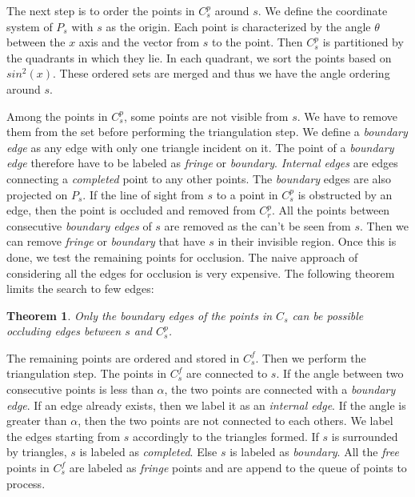 \documentclass[a4paper]{article}
\begin{document}
The next step is to order the points in $C^p_s$ around $s$. We define the coordinate system of $P_s$ with $s$ as the origin. Each point is characterized by the angle $\theta$ between the $x$ axis and the vector from $s$ to the point. Then $C^p_s$ is partitioned by the quadrants in which they lie. In each quadrant, we sort the points based on $sin^2(x)$. These ordered sets are merged and thus we have the angle ordering around $s$.

Among the points in $C^p_s$, some points are not visible from $s$. We have to remove them from the set before performing the triangulation step. We define a \textit{boundary edge} as any edge with only one triangle incident on it. The point of a \textit{boundary edge} therefore have to be labeled as \textit{fringe} or \textit{boundary}. \textit{Internal edges} are edges connecting a \textit{completed} point to any other points. The \textit{boundary} edges are also projected on $P_s$. If the line of sight from $s$ to a point in $C^p_s$ is obstructed by an edge, then the point is occluded and removed from $C^p_r$. All the points between consecutive \textit{boundary edges} of $s$ are removed as the can't be seen from $s$. Then we can remove \textit{fringe} or \textit{boundary} that have $s$ in their invisible region. Once this is done, we test the remaining points for occlusion. The naive approach of considering all the edges for occlusion is very expensive. The following theorem limits the search to few edges:
\newtheorem{mydef}{Theorem}
\begin{mydef}
Only the \emph{boundary edges} of the points in $C_s$ can be possible occluding edges between $s$ and $C^p_s$.
\end{mydef}

The remaining points are ordered and stored in $C^f_s$. Then we perform the triangulation step. The points in $C^f_s$ are connected to $s$. If the angle between two consecutive points is less than $\alpha$, the two points are connected with a \emph{boundary edge}. If an edge already exists, then we label it as an \emph{internal edge}. If the angle is greater than $\alpha$, then the two points are not connected to each others. We label the edges starting from $s$ accordingly to the triangles formed. If $s$ is surrounded by triangles, $s$ is labeled as \emph{completed}. Else $s$ is labeled as \emph{boundary}. All the \emph{free} points in $C^f_s$ are labeled as \emph{fringe} points and are append to the queue of points to process.

\newpage
\end{document}
